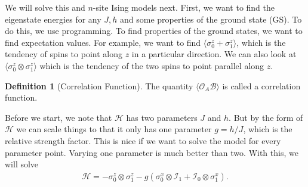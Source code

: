 \documentclass{book}
\theoremstyle{definition}
\newtheorem{defn}{Definition}[section]
\newcommand{\had}{\mathcal{H}}
\newcommand{\lp}{\left(}
\newcommand{\rp}{\right)}
\newcommand{\Id}{\mathcal{I}}
\begin{document}
We will solve this and $n$-site Ising models next. First, we want to find the eigenstate energies for any $J,h$ and some properties of the ground state (GS). To do this, we use programming. To find properties of the ground states, we want to find expectation values. For example, we want to find $\langle \sigma^z_0 + \sigma_1^z \rangle $, which is the tendency of spins to point along $z$ in a particular direction. We can also look at $\langle \sigma_0^z \otimes \sigma_1^z \rangle$ which is the tendency of the two spins to point parallel along $z$. 

\begin{defn}[Correlation Function]
	The quantity $\langle \mathcal{O}_A \mathcal{B}\rangle$ is called a correlation function. 
\end{defn}

Before we start, we note that $\had$ has two parameters $J$ and $h$. But by the form of $\had$ we can scale things to that it only has one parameter $g = h/J$, which is the relative strength factor. This is nice if we want to solve the model for every parameter point. Varying one parameter is much better than two. With this, we will solve
\begin{align}
\had = -\sigma^z_0 \otimes \sigma_1^z  - g\lp \sigma_0^x\otimes \Id_1 + \Id_0 \otimes \sigma_1^x \rp.
\end{align}
\end{document}
